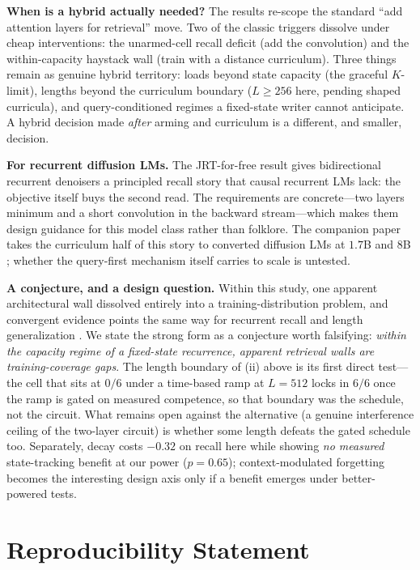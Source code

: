 \documentclass{article}
\begin{document}
\textbf{When is a hybrid actually needed?} The results re-scope the standard ``add attention layers for retrieval'' move. Two of the classic triggers dissolve under cheap interventions: the unarmed-cell recall deficit (add the convolution) and the within-capacity haystack wall (train with a distance curriculum). Three things remain as genuine hybrid territory: loads beyond state capacity (the graceful $K$-limit), lengths beyond the curriculum boundary ($L{\ge}256$ here, pending shaped curricula), and query-conditioned regimes a fixed-state writer cannot anticipate. A hybrid decision made \emph{after} arming and curriculum is a different, and smaller, decision.

\textbf{For recurrent diffusion LMs.} The JRT-for-free result gives bidirectional recurrent denoisers \citep{singh2025diffumamba,b3drwkv2026} a principled recall story that causal recurrent LMs lack: the objective itself buys the second read. The requirements are concrete---two layers minimum and a short convolution in the backward stream---which makes them design guidance for this model class rather than folklore. The companion paper takes the curriculum half of this story to converted diffusion LMs at $1.7$B and $8$B \citep{dreaminggoose}; whether the query-first mechanism itself carries to scale is untested.

\textbf{A conjecture, and a design question.} Within this study, one apparent architectural wall dissolved entirely into a training-distribution problem, and convergent evidence points the same way for recurrent recall and length generalization \citep{okpekpe2025recall,lengthgen2025,blouir2024birdie}. We state the strong form as a conjecture worth falsifying: \emph{within the capacity regime of a fixed-state recurrence, apparent retrieval walls are training-coverage gaps}. The length boundary of (ii) above is its first direct test---the cell that sits at $0/6$ under a time-based ramp at $L{=}512$ locks in $6/6$ once the ramp is gated on measured competence, so that boundary was the schedule, not the circuit. What remains open against the alternative (a genuine interference ceiling of the two-layer circuit) is whether some length defeats the gated schedule too. Separately, decay costs $-0.32$ on recall here while showing \emph{no measured} state-tracking benefit at our power ($p{=}0.65$); context-modulated forgetting \citep{kimilinear2025} becomes the interesting design axis only if a benefit emerges under better-powered tests.

\section*{Reproducibility Statement}
\end{document}
